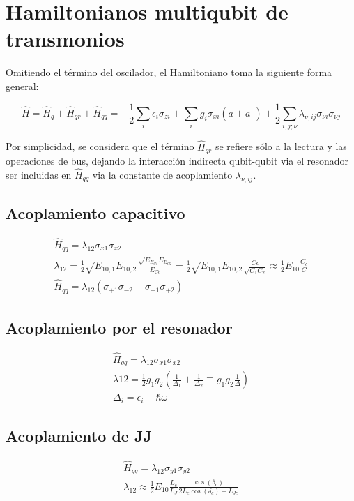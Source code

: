\documentclass[11pt, spanish]{report}
\begin{document}
\section{Hamiltonianos multiqubit de transmonios}
Omitiendo el término del oscilador, el Hamiltoniano toma la siguiente forma general:

\[
\hat{H} = \hat{H}_q + \hat{H}_{qr} + \hat{H}_{qq} = -\frac{1}{2} \sum\limits_i \epsilon_i \sigma_{zi} + \sum\limits_i g_i \sigma_{xi} (a+a^\dag) + \frac{1}{2} \sum\limits_{i,j;\nu} \lambda_{\nu,ij} \sigma_{\nu i} \sigma_{\nu j}
\]

Por simplicidad, se considera que el término $\hat{H}_{qr}$ se refiere sólo a la lectura y las operaciones de bus, dejando la interacción indirecta qubit-qubit via el resonador ser incluidas en $\hat{H}_{qq}$ via la constante de acoplamiento $\lambda_{\nu,ij}$.

\subsection{Acoplamiento capacitivo}
\begin{align*}
\hat{H}_{qq} = \lambda_{1 2} \sigma_{x1} \sigma_{x2} \\
\lambda_{1 2} = \frac{1}{2} \sqrt{E_{1 0, 1} E_{1 0, 2}} \frac{\sqrt{E_{E_{C1}} E_{E_{C2}}}}{E_{Cc}} = \frac{1}{2} \sqrt{E_{1 0, 1} E_{1 0, 2}} \frac{Cc}{\sqrt{C_1 C_2}} \approx \frac{1}{2} E_{1 0} \frac{C_c}{C} \\
\hat{H}_{qq} = \lambda_{1 2} (\sigma_{+1} \sigma_{-2}  + \sigma_{-1} \sigma_{+2})
\end{align*}

\subsection{Acoplamiento por el resonador}
\begin{align*}
\hat{H}_{qq} = \lambda_{1 2} \sigma_{x1} \sigma_{x2} \\
\lambda{1 2} = \frac{1}{2} g_1 g_2 (\frac{1}{\Delta_1} + \frac{1}{\Delta_2} \equiv g_1 g_2 \frac{1}{\Delta}) \\
\Delta_i = \epsilon_i - \hbar \omega
\end{align*}

\subsection{Acoplamiento de JJ}
\begin{align*}
\hat{H}_{qq} = \lambda_{1 2} \sigma_{y1} \sigma_{y2} \\
\lambda_{1 2} \approx \frac{1}{2} E_{1 0} \frac{L_c}{L_J} \frac{\cos(\delta_c)}{2L_c \cos(\delta_c) + L_{J c}}
\end{align*}
\end{document}
